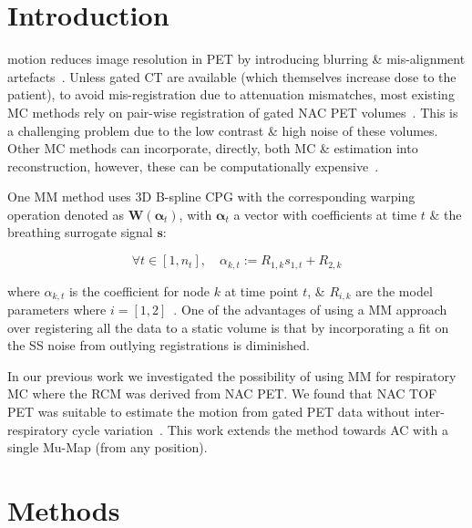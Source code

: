 \section{Introduction} \label{sec:introduction}
     motion reduces image resolution in \gls{PET} by introducing blurring \& mis-alignment artefacts~\cite{Nehmeh2008a}. Unless gated \gls{CT} are available (which themselves increase dose to the patient), to avoid mis-registration due to attenuation mismatches, most existing \gls{MC} methods rely on pair-wise registration of gated \gls{NAC} \gls{PET} volumes~\cite{LungMotionDiaphragmBaiBib}.%
    This is a challenging problem due to the low contrast \& high noise of these volumes. Other \gls{MC} methods can incorporate, directly, both \gls{MC} \&  estimation into reconstruction, however, these can be computationally expensive~\cite{Bousse2016b}.
    
    One \gls{MM} method uses \gls{3D} B-spline \gls{CPG} with the corresponding warping operation denoted as $\mathbf{W}(\mathbf{\alpha}_t)$, with $\mathbf{\alpha}_t$ a vector with coefficients at time $t$ \& the breathing surrogate signal $\mathbf{s}$:
    
    \begin{equation}
        \forall t \in [1, n_t],\quad \alpha_{k, t} := R_{1, k} s_{1, t} + R_{2, k}
    \end{equation}
    
    \noindent where $\alpha_{k, t}$ is the coefficient for node $k$ at time point $t$, \& $R_{i, k}$ are the model parameters where $i = [1, 2]$~\cite{McClelland2017}. One of the advantages of using a \gls{MM} approach over registering all the data to a static volume is that by incorporating a fit on the \gls{SS} noise from outlying registrations is diminished.
    
    In our previous work we investigated the possibility of using \gls{MM} for respiratory \gls{MC} where the \gls{RCM} was derived from \gls{NAC} \gls{PET}. We found that \gls{NAC} \gls{TOF} \gls{PET} was suitable to estimate the motion from gated PET data without inter-respiratory cycle variation~\cite{Whitehead2019ImpactPET}. This work extends the method towards \gls{AC} with a single \gls{Mu-Map} (from any position).

\section{Methods} \label{sec:methods}
